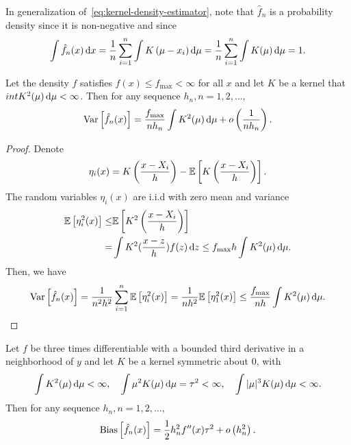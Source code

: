 In generalization of~\eqref{eq:kernel-density-estimator}, note that \(\hat{f}_{n}\) is a probability density since it is non-negative and since
\begin{equation*}
	\int\hat{f}_{n}(x)\mathop{}\!\mathrm{d} x=\frac{1}{n}\sum_{i=1}^{n}\int K\left(\mu-x_i\right)\mathop{}\!\mathrm{d}\mu=\frac{1}{n}\sum_{i=1}^{n}\int K(\mu)\mathop{}\!\mathrm{d}\mu=1.
\end{equation*}

\begin{theorem}
	Let the density \(f\) satisfies \(f(x)\leq f_{\max}<\infty\) for all \(x\) and let \(K\) be a kernel that \(int K^2(\mu)\mathop{}\!\mathrm{d}\mu<\infty\). Then for any sequence \(h_{n},n=1,2,\ldots\),
	\begin{equation*}
		\mathrm{Var}\left[\hat{f}_{n}(x)\right]= \frac{f_{\max}}{nh_{n}}\int K^2(\mu)\mathop{}\!\mathrm{d}\mu+o\left(\frac{1}{nh_{n}}\right).
	\end{equation*}
\end{theorem}

\begin{proof}
	Denote
	\begin{equation*}
		\eta_{i}(x)=K\left(\frac{x-X_{i}}{h}\right)-\mathbb{E}\left[K\left(\frac{x-X_{i}}{h}\right)\right].
	\end{equation*}
	The random variables \(\eta_{i}(x)\) are i.i.d with zero mean and variance
	\begin{equation*}
		\begin{aligned}
			\mathbb{E}\left[\eta_{i}^2(x)\right]\leq & \mathbb{E}\left[K^2\left(\frac{x-X_{i}}{h}\right)\right]                   \\
			=                                  & \int K^2(\frac{x-z}{h})f(z)\mathop{}\!\mathrm{d} z\leq f_{\max}h\int K^2(\mu)\mathop{}\!\mathrm{d}\mu.
		\end{aligned}
	\end{equation*}
	Then, we have
	\begin{equation*}
		\mathrm{Var}\left[\hat{f}_{n}(x)\right]=\frac{1}{n^2h^2}\sum_{i=1}^{n}\mathbb{E}\left[\eta_{i}^2(x)\right]=\frac{1}{nh^2}\mathbb{E}\left[\eta_{1}^2(x)\right]\leq \frac{f_{\max}}{nh} \int K^2(\mu)\mathop{}\!\mathrm{d}\mu.
	\end{equation*}
\end{proof}

\begin{theorem}
	Let \(f\) be three times differentiable with a bounded third derivative in a neighborhood of \(y\) and let \(K\) be a kernel symmetric about \(0\), with
	\begin{equation*}
		\int K^2(\mu)\mathop{}\!\mathrm{d}\mu<\infty,\quad\int\mu^2K(\mu)\mathop{}\!\mathrm{d}\mu=\tau^2<\infty,\quad\int|\mu|^3 K(\mu)\mathop{}\!\mathrm{d}\mu<\infty.
	\end{equation*}
	Then for any sequence \(h_{n},n=1,2,\ldots\),
	\begin{equation*}
		\mathrm{Bias}\left[\hat{f}_{n}(x)\right]=\frac{1}{2}h_{n}^2f^{\prime\prime}(x)\tau^2+o\left(h_{n}^2\right).
	\end{equation*}
\end{theorem}

